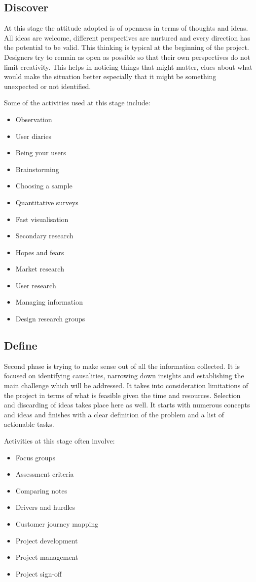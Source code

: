 		\subsection{Discover}

At this stage the attitude adopted is of openness in terms of thoughts and ideas. All ideas are welcome, different perspectives are nurtured and every direction has the potential to be valid. This thinking is typical at the beginning of the project. Designers try to remain as open as possible so that their own perspectives do not limit creativity. This helps in noticing things that might matter, clues about what would make the situation better especially that it might be something unexpected or not identified.

Some of the activities used at this stage include:
\begin{itemize}
\item Observation
\item User diaries
\item Being your users
\item Brainstorming
\item Choosing a sample
\item Quantitative surveys
\item Fast visualisation
\item Secondary research
\item Hopes and fears
\item Market research
\item User research
\item Managing information
\item Design research groups
\end{itemize}

		\subsection{Define}
		
Second phase is trying to make sense out of all the information collected. It is focused on identifying causalities, narrowing down insights and establishing the main challenge which will be addressed. It takes into consideration limitations of the project in terms of what is feasible given the time and resources. Selection and discarding of ideas takes place here as well. It starts with numerous concepts and ideas and finishes with a clear definition of the problem and a list of actionable tasks.

Activities at this stage often involve:
\begin{itemize}
\item Focus groups
\item Assessment criteria
\item Comparing notes
\item Drivers and hurdles
\item Customer journey mapping
\item Project development
\item Project management
\item Project sign-off
\end{itemize}

